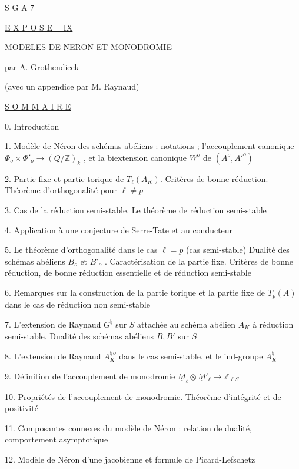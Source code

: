 


S G A 7


\underline{E X P O S E \ \ IX}


\underline{\underline{MODELES DE NERON ET MONODROMIE}}


\underline{par A. Grothendieck}

(avec un appendice par M. Raynaud)


\underline{S O M M A I R E}

0. Introduction

1. Modèle de Néron des schémas abéliens : notations ; l'accouplement canonique $\Phi_o \times \Phi'_o \longrightarrow (Q/\mathbb{Z})_k$ , et la biextension canonique $W^o$ de $(A^o,{A'}^o)$

2. Partie fixe et partie torique de $T_\ell(A_K)$. Critères de bonne réduction. Théorème d'orthogonalité pour $\ell \neq p$

3. Cas de la réduction semi-stable. Le théorème de réduction semi-stable

4. Application à une conjecture de Serre-Tate et au conducteur

5. Le théorème d'orthogonalité dans le cas $\ell = p$ (cas semi-stable) Dualité des schémas abéliens $B_o$ et $B'_o$ . Caractérisation de la partie fixe. Critères de bonne réduction, de bonne réduction essentielle et de réduction semi-stable

6. Remarques sur la construction de la partie torique et la partie fixe de $T_p(A)$ dans le cas de réduction non semi-stable

7. L'extension de Raynaud $G^\natural$ sur $S$ attachée au schéma abélien $A_K$ à réduction semi-stable. Dualité des schémas abéliens $B,B'$ sur $S$

8. L'extension de Raynaud $A_K^{\natural\,o}$ dans le cas semi-stable, et le ind-groupe $A_K^{\natural}$

9. Définition de l'accouplement de monodromie $\underline{M}_\ell \otimes \underline{M}'_\ell \longrightarrow \mathbb{Z}_{\ell S}$

10. Propriétés de l'accouplement de monodromie. Théorème d'intégrité et de positivité

11. Composantes connexes du modèle de Néron : relation de dualité, comportement asymptotique



12. Modèle de Néron d'une jacobienne et formule de Picard-Lefschetz

